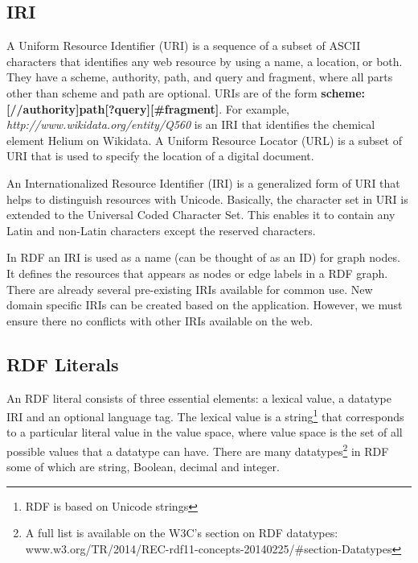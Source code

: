 \documentclass[12 pt, a4paper]{report}
\theoremstyle{definition}
\begin{document}
\subsection*{IRI}
A Uniform Resource Identifier (\acrshort{URI}) is a sequence of a subset of ASCII characters that identifies any web resource by using a name, a location, or both. They have a scheme, authority, path, and query and fragment, where all parts other than scheme and path are optional. URIs are of the form \textbf{scheme:[//authority]path[?query][\#fragment]}. For example, \textit{http://www.wikidata.org/entity/Q560} is an IRI that identifies the chemical element Helium on Wikidata. A Uniform Resource Locator (\acrshort{URL}) is a subset of URI that is used to specify the location of a digital document.

An Internationalized Resource Identifier (\acrshort{IRI}) is a generalized form of URI that helps to distinguish resources with Unicode. Basically, the character set in URI is extended to the Universal Coded Character Set. This enables it to contain any Latin and non-Latin characters except the reserved characters.

In RDF an IRI is used as a name (can be thought of as an ID) for graph nodes. It defines the resources that appears as nodes or edge labels in a RDF graph. There are already several pre-existing IRIs available for common use. New domain specific IRIs can be created based on the application. However, we must ensure there no conflicts with other IRIs available on the web.

\subsection*{RDF Literals}

An RDF literal consists of three essential elements: a lexical value, a datatype IRI and an optional language tag. The lexical value is a string\footnote{RDF is based on Unicode strings} that corresponds to a particular literal value in the value space, where value space is the set of all possible values that a datatype can have. There are many datatypes\footnote{A full list is available on the W3C's section on RDF datatypes: www.w3.org/TR/2014/REC-rdf11-concepts-20140225/\#section-Datatypes} in RDF some of which are string, Boolean, decimal and integer.
\end{document}
